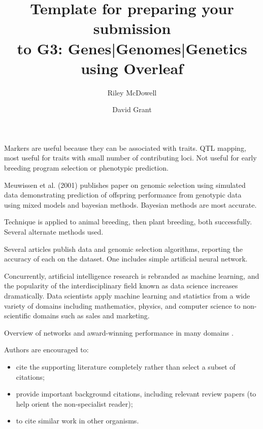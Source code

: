 \documentclass[9pt,twocolumn,twoside]{g3_article/gsag3jnl}
\title{Template for preparing your submission \\to G3: Genes|Genomes|Genetics using Overleaf}
\author[$\ast$,1]{Riley McDowell}
\author[$\dagger$]{David Grant}
\affil[$\ast$]{Iowa State University, US}
\affil[$\dagger$]{Iowa State University, US}
\begin{document}
\maketitle
\thispagestyle{firststyle}
\logomark
\articletypemark
\marginmark
\firstpagefootnote
{}%
\vspace{-11pt}%

\noindent %

Markers are useful because they can be associated with traits.
QTL mapping, most useful for traits with small number of contributing loci.
Not useful for early breeding program selection or phenotypic prediction.

Meuwissen et al. (2001) publishes paper on genomic selection using
simulated data demonstrating prediction of offspring performance
from genotypic data using mixed models and bayesian methods.
Bayesian methods are most accurate.

Technique is applied to animal breeding, then plant breeding,
both successfully. Several alternate methods used. 

Several articles publish data and genomic selection algorithms,
reporting the accuracy of each on the dataset. One includes 
simple artificial neural network.

Concurrently, artificial intelligence research is rebranded as machine
learning, and the popularity of the interdisciplinary field known as data science 
increases dramatically. Data scientists apply machine learning and statistics 
from a wide variety of domains including mathematics, physics, and 
computer science to non-scientific domains such as sales and marketing.

Overview of networks and award-winning performance in many domains \citep{schmidhuber2015}.




Authors are encouraged to:

\begin{itemize}
\item cite the supporting literature completely rather than select a subset of citations;
\item provide important background citations, including relevant review papers (to help orient the non-specialist reader);
\item to cite similar work in other organisms.
\end{itemize}
\end{document}
